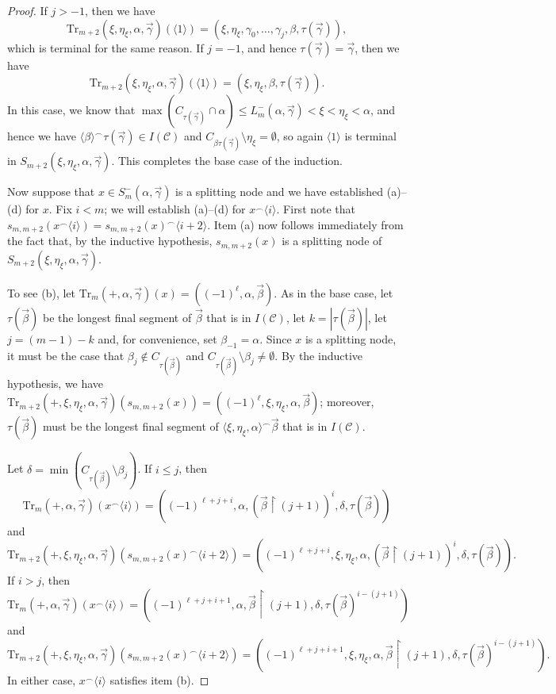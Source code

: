 \documentclass{amsart}
\numberwithin{theorem}{section}
\theoremstyle{definition}
\newcommand{\mc}{\mathcal}
\begin{document}
\begin{proof}
  If $j > -1$, then we have
  \[
    \mathrm{Tr}_{m+2}(\xi,\eta_\xi,\alpha,\vec{\gamma})(\langle 1 \rangle) = 
    (\xi, \eta_\xi, \gamma_0, \ldots, \gamma_j, \beta, \tau(\vec{\gamma})),
  \]
  which is terminal for the same reason. If $j = -1$, and hence 
  $\tau(\vec{\gamma}) = \vec{\gamma}$, then we have
  \[
    \mathrm{Tr}_{m+2}(\xi,\eta_\xi,\alpha,\vec{\gamma})(\langle 1 \rangle) = 
    (\xi, \eta_\xi, \beta, \tau(\vec{\gamma})).
  \]
  In this case, we know that $\max(C_{\tau(\vec{\gamma})} \cap \alpha) 
  \leq L^-_m(\alpha,\vec{\gamma}) < \xi < \eta_\xi < \alpha$, and hence we have 
  $\langle \beta \rangle ^\smallfrown \tau(\vec{\gamma}) \in I(\mc{C})$ and 
  $C_{\beta \tau(\vec{\gamma})} \setminus \eta_\xi = \emptyset$, so again 
  $\langle 1 \rangle$ is terminal in $S_{m+2}(\xi,\eta_\xi,\alpha,\vec{\gamma})$. 
  This completes the base case of the induction.
  
  Now suppose that $x \in S^-_m(\alpha, \vec{\gamma})$ is a splitting node and 
  we have established (a)--(d) for $x$. Fix $i < m$; we will establish 
  (a)--(d) for $x^\smallfrown \langle i \rangle$. First note that 
  $s_{m,m+2}(x^\smallfrown \langle i \rangle) = s_{m,m+2}(x)^\smallfrown \langle i+2 \rangle$. 
  Item (a) now follows immediately from the fact that, by the inductive hypothesis, 
  $s_{m,m+2}(x)$ is a splitting node of $S_{m+2}(\xi,\eta_\xi,\alpha,\vec{\gamma})$.
  
  To see (b), let $\mathrm{Tr}_m(+,\alpha,\vec{\gamma})(x) = ((-1)^\ell, \alpha, 
  \vec{\beta})$. As in the base case, let $\tau(\vec{\beta})$ be the longest final 
  segment of $\vec{\beta}$ that is in $I(\mc{C})$, let $k = |\tau(\vec{\beta})|$, 
  let $j = (m-1)-k$ and, for convenience, set $\beta_{-1} = \alpha$. Since $x$ is a 
  splitting node, it must be the case that $\beta_j \notin C_{\tau(\vec{\beta})}$ 
  and $C_{\tau(\vec{\beta})} \setminus \beta_j \neq \emptyset$. By the inductive 
  hypothesis, we have $\mathrm{Tr}_{m+2}(+,\xi,\eta_\xi,\alpha,\vec{\gamma})
  (s_{m,m+2}(x)) = ((-1)^\ell, \xi, \eta_\xi, \alpha, \vec{\beta})$; moreover, $\tau(\vec{\beta})$ 
  must be the longest final segment of $\langle \xi,\eta_\xi,\alpha \rangle^\frown \vec{\beta}$ 
  that is in $I(\mc{C})$.
  
  Let $\delta = \min(C_{\tau(\vec{\beta})} \setminus \beta_j)$. If $i \leq j$, then 
  \[
    \mathrm{Tr}_m(+,\alpha,\vec{\gamma})(x^\smallfrown \langle i \rangle) = 
    ((-1)^{\ell+j+i},\alpha, (\vec{\beta} \restriction (j+1))^i, \delta, \tau(\vec{\beta}))
  \]
  and 
  \[
    \mathrm{Tr}_{m+2}(+,\xi,\eta_\xi,\alpha,\vec{\gamma})(s_{m,m+2}(x)^\smallfrown 
    \langle i+2 \rangle) = ((-1)^{\ell+j+i}, \xi,\eta_\xi,\alpha, (\vec{\beta} \restriction (j+1))^i, 
    \delta, \tau(\vec{\beta})).
  \]
  If $i > j$, then 
  \[
    \mathrm{Tr}_m(+,\alpha,\vec{\gamma})(x^\smallfrown \langle i \rangle) = 
    ((-1)^{\ell+j+i+1}, \alpha, \vec{\beta} \restriction (j+1), \delta, \tau(\vec{\beta})^{i-(j+1)})
  \]
  and 
  \[
    \mathrm{Tr}_{m+2}(+,\xi,\eta_\xi,\alpha,\vec{\gamma})(s_{m,m+2}(x)^\smallfrown 
    \langle i+2 \rangle) = ((-1)^{\ell+j+i+1}, \xi,\eta_\xi,\alpha, \vec{\beta} \restriction (j+1), 
    \delta, \tau(\vec{\beta})^{i-(j+1)}).
  \]
  In either case, $x^\smallfrown \langle i \rangle$ satisfies item (b).
  

\end{proof}
\end{document}
